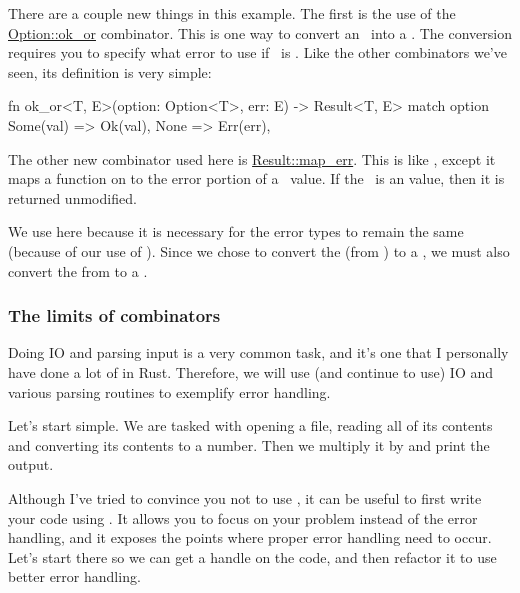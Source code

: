 There are a couple new things in this example. The first is the use of the 
\href{https://doc.rust-lang.org/std/option/enum.Option.html\#method.ok\_or}{Option::ok\_or} combinator. This is one way to 
convert an \option\ into a \result. The conversion requires you to specify what error to use if \option\ is \none. Like 
the other combinators we've seen, its definition is very simple:

\begin{rustc}
fn ok_or<T, E>(option: Option<T>, err: E) -> Result<T, E> {
    match option {
        Some(val) => Ok(val),
        None => Err(err),
    }
}
\end{rustc}

The other new combinator used here is \href{https://doc.rust-lang.org/std/result/enum.Result.html\#method.map\_err}
{Result::map\_err}. This is like , except it maps a function on to the error portion of a \result\ value. 
If the \result\ is an  value, then it is returned unmodified.

\blank

We use  here because it is necessary for the error types to remain the same (because of our use of 
). Since we chose to convert the  (from ) to a ,
we must also convert the  from  to a \String.

\subsubsection*{The limits of combinators}

Doing IO and parsing input is a very common task, and it's one that I personally have done a lot of in Rust. Therefore, we 
will use (and continue to use) IO and various parsing routines to exemplify error handling.

\blank

Let's start simple. We are tasked with opening a file, reading all of its contents and converting its contents to a number. 
Then we multiply it by  and print the output.

\blank

Although I've tried to convince you not to use , it can be useful to first write your code using . 
It allows you to focus on your problem instead of the error handling, and it exposes the points where proper error handling 
need to occur. Let's start there so we can get a handle on the code, and then refactor it to use better error handling.

